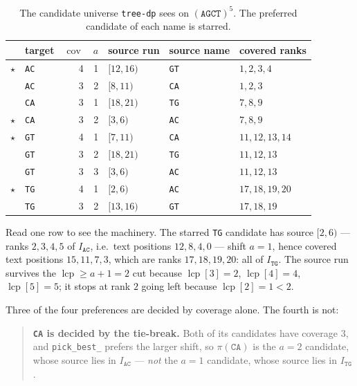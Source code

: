 \documentclass[11pt,a4paper]{article}
\theoremstyle{definition}
\theoremstyle{plain}
\theoremstyle{remark}
\newcommand{\cov}{\operatorname{cov}}
\newcommand{\lcp}{\operatorname{lcp}}
\newcommand{\pref}{\pi}
\begin{document}
\begin{table}[h]
\centering
\caption{The candidate universe \texttt{tree-dp} sees on
  $(\mathtt{AGCT})^5$. The preferred candidate of each name is starred.}
\label{tab:cands}
\begin{tabular}{llrrlll}
\toprule
& target & $\cov$ & $a$ & source run & source name & covered ranks \\
\midrule
$\star$ & \texttt{AC} & 4 & 1 & $[12,16)$ & \texttt{GT} & $1,2,3,4$ \\
        & \texttt{AC} & 3 & 2 & $[8,11)$  & \texttt{CA} & $1,2,3$ \\
\midrule
        & \texttt{CA} & 3 & 1 & $[18,21)$ & \texttt{TG} & $7,8,9$ \\
$\star$ & \texttt{CA} & 3 & 2 & $[3,6)$   & \texttt{AC} & $7,8,9$ \\
\midrule
$\star$ & \texttt{GT} & 4 & 1 & $[7,11)$  & \texttt{CA} & $11,12,13,14$ \\
        & \texttt{GT} & 3 & 2 & $[18,21)$ & \texttt{TG} & $11,12,13$ \\
        & \texttt{GT} & 3 & 3 & $[3,6)$   & \texttt{AC} & $11,12,13$ \\
\midrule
$\star$ & \texttt{TG} & 4 & 1 & $[2,6)$   & \texttt{AC} & $17,18,19,20$ \\
        & \texttt{TG} & 3 & 2 & $[13,16)$ & \texttt{GT} & $17,18,19$ \\
\bottomrule
\end{tabular}
\end{table}

Read one row to see the machinery. The starred \texttt{TG} candidate has
source $[2,6)$ --- ranks $2,3,4,5$ of $I_{\mathtt{AC}}$, i.e.\ text
positions $12, 8, 4, 0$ --- shift $a = 1$, hence covered text positions
$15, 11, 7, 3$, which are ranks $17,18,19,20$: all of
$I_{\mathtt{TG}}$. The source run survives the $\lcp \ge a+1 = 2$ cut
because $\lcp[3] = 2$, $\lcp[4] = 4$, $\lcp[5] = 5$; it stops at rank
$2$ going left because $\lcp[2] = 1 < 2$.

Three of the four preferences are decided by coverage alone. The fourth
is not:

\begin{quote}
\textbf{\texttt{CA} is decided by the tie-break.} Both of its
candidates have coverage $3$, and \texttt{pick\_best\_} prefers the
larger shift, so
$\pref(\mathtt{CA})$ is the $a = 2$ candidate, whose source lies in
$I_{\mathtt{AC}}$ --- \emph{not} the $a = 1$ candidate, whose source
lies in $I_{\mathtt{TG}}$.
\end{quote}
\end{document}

